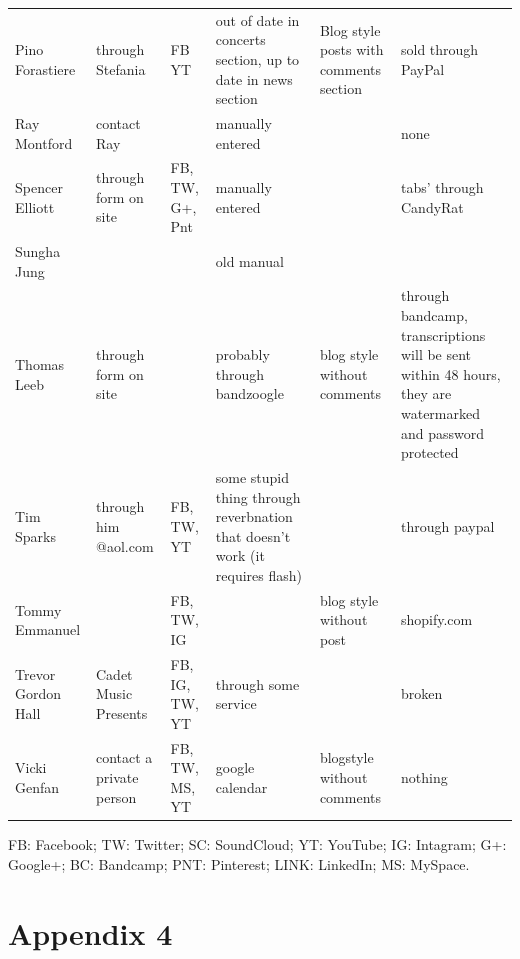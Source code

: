 \documentclass[unicode,hyperfootnotes=false,xetex,colorlinks=true,nofonts,nobib]{tufte-handout}
\begin{document}
\begin{longtable}{p{} p{} p{} p{} p{} p{}}
  Pino Forastiere & through Stefania & FB YT  & out of date in concerts section, up to date in news section & Blog style posts with comments section & sold through PayPal\\
  Ray Montford & contact Ray &  & manually entered &  & none\\
  Spencer Elliott & through form on site & FB, TW, G+, Pnt & manually entered &  & tabs’ through CandyRat\\
  Sungha Jung &  &  & old manual &  & \\
  Thomas Leeb & through form on site &  & probably through bandzoogle & blog style without comments & through bandcamp, transcriptions will be sent within 48 hours, they are watermarked and password protected\\
  Tim Sparks & through him @aol.com & FB, TW, YT & some stupid thing through reverbnation that doesn’t work (it requires flash) &  & through paypal\\
  Tommy Emmanuel &  & FB, TW, IG &  & blog style without post & shopify.com\\
  Trevor Gordon Hall & Cadet Music Presents & FB, IG, TW, YT & through some service &  & broken\\
  Vicki Genfan & contact a private person & FB, TW, MS, YT & google calendar & blogstyle without comments & nothing\\
  
\end{longtable}
FB: Facebook; TW: Twitter; SC: SoundCloud; YT: YouTube; IG: Intagram; G+: Google+; BC: Bandcamp; PNT: Pinterest; LINK: LinkedIn; MS: MySpace.\\

\clearpage
\section{Appendix 4}
\label{sec:appendix-4}
\end{document}
